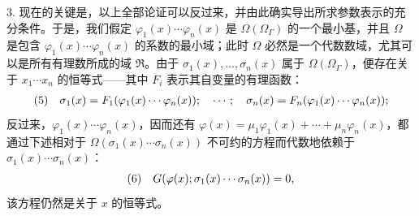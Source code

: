 3. 现在的关键是，以上全部论证可以反过来，并由此确实导出所求参数表示的充分条件。于是，我们假定 $\varphi_1(x)\cdots\varphi_n(x)$ 是 $\Omega(\Omega_\Gamma)$ 的一个最小基，并且 $\Omega$ 是包含 $\varphi_1(x)\cdots\varphi_n(x)$ 的系数的最小域；此时 $\Omega$ 必然是一个代数数域，尤其可以是所有有理数所成的域 $\mathfrak R$。由于 $\sigma_1(x),\ldots,\sigma_n(x)$ 属于 $\Omega(\Omega_\Gamma)$，便存在关于 $x_1\cdots x_n$ 的恒等式——其中 $F_i$ 表示其自变量的有理函数：
\[
\begin{array}{@{}l@{\quad}l@{}}
(5)& \displaystyle \sigma_1(x)=F_1(\varphi_1(x)\cdots\varphi_n(x));\quad \cdots;\quad \sigma_n(x)=F_n(\varphi_1(x)\cdots\varphi_n(x));
\end{array}
\]
反过来，$\varphi_1(x)\cdots\varphi_n(x)$，因而还有 $\varphi(x)=\mu_1\varphi_1(x)+\cdots+\mu_n\varphi_n(x)$，都通过下述相对于 $\Omega(\sigma_1(x)\cdots\sigma_n(x))$ 不可约的方程而代数地依赖于 $\sigma_1(x)\cdots\sigma_n(x)$：
\[
\begin{array}{@{}l@{\quad}l@{}}
(6)& \displaystyle G(\varphi(x);\sigma_1(x)\cdots\sigma_n(x))=0,
\end{array}
\]
该方程仍然是关于 $x$ 的恒等式。

